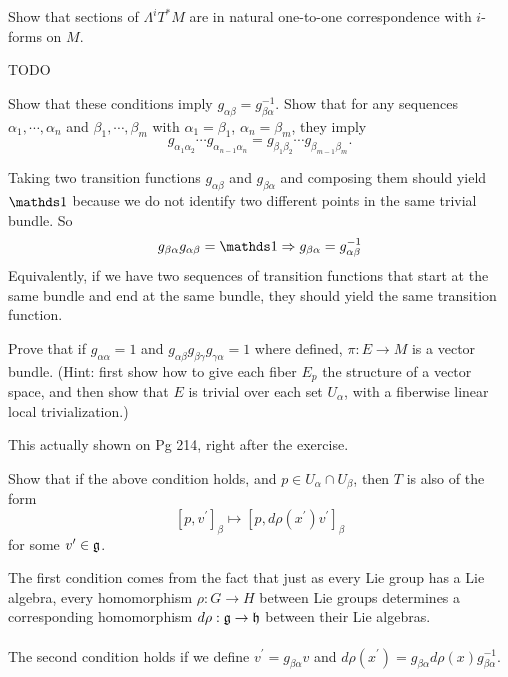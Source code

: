 \documentclass[10pt]{article}
\begin{document}
\begin{example}
	Show that sections of $\Lambda^i T^*M$ are in natural one-to-one correspondence with $i$-forms on $M$.
\end{example}
\sol TODO


\begin{example}
	Show that these conditions imply $g_{\alpha\beta} = g_{\beta\alpha}^{-1}$. Show that for any sequences $\alpha_1,\cdots,\alpha_n$ and $\beta_1,\cdots,\beta_m$ with $\alpha_1 = \beta_1$, $\alpha_n = \beta_m$, they imply
	$$
	g_{\alpha_1\alpha_2}\cdots g_{\alpha_{n-1}\alpha_n} = g_{\beta_1\beta_2}\cdots g_{\beta_{m-1}\beta_m}.
	$$ 
\end{example}
\sol Taking two transition functions $g_{\alpha\beta}$ and $g_{\beta\alpha}$ and composing them should yield $\id$ because we do not identify two different points in the same trivial bundle. So
$$
g_{\beta\alpha}g_{\alpha\beta} = \id\Rightarrow g_{\beta\alpha} = g_{\alpha\beta}^{-1}
$$
Equivalently, if we have two sequences of transition functions that start at the same bundle and end at the same bundle, they should yield the same transition function.


\begin{example}
	Prove that if $g_{\alpha\alpha} = 1$ and $g_{\alpha\beta}g_{\beta\gamma}g_{\gamma\alpha} = 1$ where defined, $\pi:E\to M$ is a vector bundle. (Hint: first show how to give each fiber $E_p$ the structure of a vector space, and then show that $E$ is trivial over each set $U_\alpha$, with a fiberwise linear local trivialization.)
\end{example}
\sol This actually shown on Pg 214, right after the exercise.


\begin{example}
	Show that if the above condition holds\mn{$$[p,v]_\alpha \mapsto [p,d\rho(x)v]_\alpha$$}, and $p \in U_\alpha \cap U_\beta$, then $T$ is also of the form
	$$
	[p,v^\prime]_\beta \mapsto [p,d\rho(x^\prime)v^\prime]_\beta
	$$
	for some $v^\prime \in \mathfrak{g}$.
\end{example}
\sol The first condition comes from the fact that just as every Lie group has a Lie algebra, every homomorphism $\rho:G\to H$ between Lie groups determines a corresponding homomorphism $d\rho:\mathfrak{g}\to \mathfrak{h}$ between their Lie algebras.\\\\
The second condition holds if we define $v^\prime = g_{\beta\alpha}v$ and $d\rho(x^\prime) = g_{\beta\alpha}d\rho(x)g_{\beta\alpha}^{-1}$.
\end{document}
